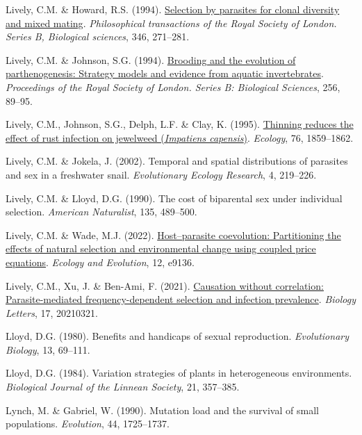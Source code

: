 \documentclass[
  letterpaper,
]{book}
\newlength{\cslhangindent}
\newenvironment{CSLReferences}[2] %
 {\begin{list}{}{%
  \setlength{\itemindent}{0pt}
  \setlength{\leftmargin}{0pt}
  \setlength{\parsep}{0pt}
  \ifodd #1
   \setlength{\leftmargin}{\cslhangindent}
   \setlength{\itemindent}{-1\cslhangindent}
  \fi
  \setlength{\itemsep}{#2\baselineskip}}}
 {\end{list}}
\begin{document}
\begin{CSLReferences}{1}{0}
Lively, C.M. \& Howard, R.S. (1994).
\href{https://doi.org/10.1098/rstb.1994.0144}{Selection by parasites for
clonal diversity and mixed mating}. \emph{Philosophical transactions of
the Royal Society of London. Series B, Biological sciences}, 346,
271--281.

Lively, C.M. \& Johnson, S.G. (1994).
\href{https://doi.org/10.1098/rspb.1994.0054}{Brooding and the evolution
of parthenogenesis: Strategy models and evidence from aquatic
invertebrates}. \emph{Proceedings of the Royal Society of London. Series
B: Biological Sciences}, 256, 89--95.

Lively, C.M., Johnson, S.G., Delph, L.F. \& Clay, K. (1995).
\href{https://doi.org/10.2307/1940718}{Thinning reduces the effect of
rust infection on jewelweed (\emph{{I}mpatiens capensis})}.
\emph{Ecology}, 76, 1859--1862.

Lively, C.M. \& Jokela, J. (2002). Temporal and spatial distributions of
parasites and sex in a freshwater snail. \emph{Evolutionary Ecology
Research}, 4, 219--226.

Lively, C.M. \& Lloyd, D.G. (1990). The cost of biparental sex under
individual selection. \emph{American Naturalist}, 135, 489--500.

Lively, C.M. \& Wade, M.J. (2022).
\href{https://doi.org/10.1002/ece3.9136}{Host--parasite coevolution:
Partitioning the effects of natural selection and environmental change
using coupled price equations}. \emph{Ecology and Evolution}, 12, e9136.

Lively, C.M., Xu, J. \& Ben-Ami, F. (2021).
\href{https://doi.org/10.1098/rsbl.2021.0321}{Causation without
correlation: Parasite-mediated frequency-dependent selection and
infection prevalence}. \emph{Biology Letters}, 17, 20210321.

Lloyd, D.G. (1980). Benefits and handicaps of sexual reproduction.
\emph{Evolutionary Biology}, 13, 69--111.

Lloyd, D.G. (1984). Variation strategies of plants in heterogeneous
environments. \emph{Biological Journal of the Linnean Society}, 21,
357--385.

Lynch, M. \& Gabriel, W. (1990). Mutation load and the survival of small
populations. \emph{Evolution}, 44, 1725--1737.


\end{CSLReferences}
\end{document}

